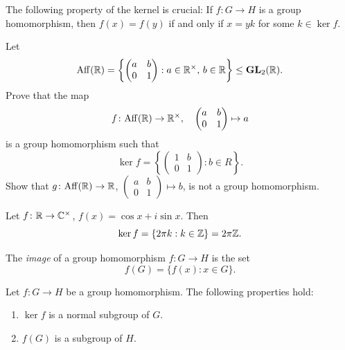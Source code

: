 The following property of the kernel is crucial: If $f\colon G\to H$
is a group homomorphism, then 
$f(x)=f(y)$ if and only if $x=yk$ for some $k\in\ker f$.


\begin{exercise}
\label{xca:affine}
Let
\[
\mathrm{Aff}(\mathbb{R})=\left\{\begin{pmatrix}a&b\\0&1\end{pmatrix}:a\in\mathbb{R}^\times,\,b\in\mathbb{R}\right\}\leq\mathbf{GL}_2(\mathbb{R}).
\]
Prove that the map
\[
f\colon \mathrm{Aff}(\mathbb{R})\to\mathbb{R}^\times,\quad
\begin{pmatrix}
a&b\\
0&1
\end{pmatrix}
\mapsto a
\]
is a group homomorphism such that 
\[
\ker f=\left\{\begin{pmatrix}
1&b\\
0&1
\end{pmatrix}
:b\in R\right\}.
\]
Show that $g\colon\mathrm{Aff}(\mathbb{R})\to\mathbb{R}$, $\begin{pmatrix}a&b\\0&1\end{pmatrix}\mapsto b$,
is not a group homomorphism.
\end{exercise}



\begin{example}
Let $f\colon\mathbb{R}\to\mathbb{C}^\times$, $f(x)=\cos x+i\sin x$. Then 
\[
\ker f=\{2\pi k:k\in\mathbb{Z}\}=2\pi\mathbb{Z}.
\]
\end{example}

\begin{definition}
The \emph{image} of a group homomorphism $f\colon G\to H$
is the set 
\[
f(G)=\{f(x):x\in G\}.
\]
\end{definition}

\begin{proposition}
    Let $f\colon G\to H$ be a group homomorphism.
    The following properties hold: 
        \begin{enumerate}
                \item $\ker f$ is a normal subgroup of $G$.
                \item $f(G)$ is a subgroup of $H$.
        \end{enumerate}
\end{proposition}

